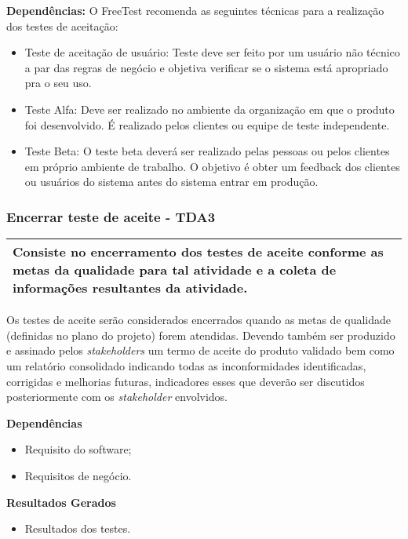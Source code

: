 \textbf{Dependências:} O FreeTest recomenda as seguintes técnicas para a realização dos testes de aceitação: 

\begin{itemize}
    \item Teste de aceitação de usuário: Teste deve ser feito por um usuário não técnico a par das regras de negócio e objetiva verificar se o sistema está apropriado pra o seu uso.
    \item Teste Alfa: Deve ser realizado no ambiente da organização em que o produto foi desenvolvido. É realizado pelos clientes ou equipe de teste independente.
    \item Teste Beta: O teste beta deverá ser realizado pelas pessoas ou pelos clientes em próprio ambiente de trabalho. O objetivo é obter um feedback dos clientes ou usuários do sistema antes do sistema entrar em produção.
\end{itemize}

\subsubsection{Encerrar teste de aceite - TDA3}
\label{sec:tda3}

\begin{table}[!ht]
\centering
\begin{tabular}{|p{130mm}|}
\hline
Consiste no encerramento dos testes de aceite conforme as metas da qualidade para tal atividade e a coleta de informações resultantes da atividade. \\ 
\hline
\end{tabular}
\end{table}

Os testes de aceite serão considerados encerrados quando as metas de qualidade (definidas no plano do projeto) forem atendidas. Devendo também ser produzido e assinado pelos \textit{stakeholders} um termo de aceite do produto validado bem como um relatório consolidado indicando todas as inconformidades identificadas, corrigidas e melhorias futuras, indicadores esses que deverão ser discutidos posteriormente com os \textit{stakeholder} envolvidos.

\textbf{Dependências}
\begin{itemize}
    \item Requisito do software;
    \item Requisitos de negócio.
\end{itemize}

\textbf{Resultados Gerados}
\begin{itemize}
    \item Resultados dos testes.
\end{itemize}


